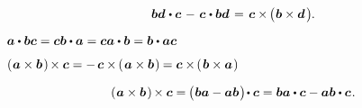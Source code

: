 \nopagebreak\vspace{-1.2em}\begin{equation}
\bm{b} \bm{d} \hspace{.1ex} \dotp \bm{c} \hspace{.25ex} - \hspace{.25ex} \bm{c} \hspace{.1ex} \dotp \bm{b} \bm{d}
\hspace{.25ex} = \hspace{.25ex}
\bm{c} \times \hspace{-0.2ex} \bigl( \hspace{.1ex} \bm{b} \times \bm{d} \hspace{.25ex} \bigr)
\hspace{-0.1ex} .
\end{equation}

\noindent ${
\bm{a} \dotp \bm{b} \bm{c} = \bm{c} \bm{b} \dotp \bm{a} = \bm{c} \bm{a} \dotp \bm{b} = \bm{b} \dotp \bm{a} \bm{c}
}$

\noindent ${
\left(\hspace{.1ex} \bm{a} \times \bm{b} \hspace{.2ex}\right) \hspace{-0.2ex} \times \bm{c}
= - \hspace{.33ex} \bm{c} \times \hspace{-0.15ex} \left(\hspace{.2ex}{\bm{a} \times \bm{b}}\hspace{.15ex}\right) \hspace{-0.1ex}
= \bm{c} \times \hspace{-0.2ex} \left(\hspace{.2ex}{\bm{b} \times \bm{a}}\hspace{.15ex}\right)
}$

\vspace{-0.15em} \noindent
\textcolor{magenta}{ }

\nopagebreak\vspace{-0.2em}\begin{equation}
\left(\hspace{.1ex} \bm{a} \times \bm{b} \hspace{.2ex}\right) \hspace{-0.2ex} \times \bm{c}
= \hspace{-0.15ex} \bigl( \hspace{.1ex} \bm{b} \bm{a} - \bm{a} \bm{b} \hspace{.15ex} \bigr) \hspace{-0.3ex} \dotp \bm{c}
= \bm{b} \bm{a} \dotp \bm{c} - \bm{a} \bm{b} \dotp \bm{c}
\hspace{.15ex} .
\end{equation}

